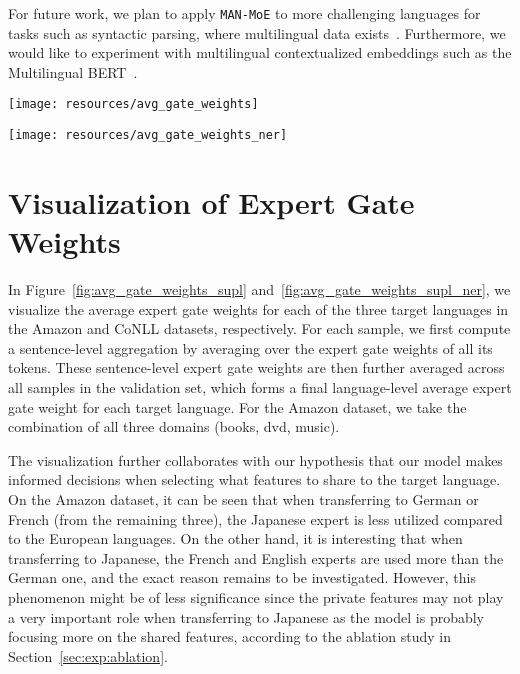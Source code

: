 \documentclass[11pt,a4paper]{article}
\newcommand{\manmoe}{\texttt{MAN-MoE}}
\begin{document}
For future work, we plan to apply \manmoe{} to more challenging languages for tasks such as syntactic parsing, where multilingual data exists~\cite{11234/1-2184}.
Furthermore, we would like to experiment with multilingual contextualized embeddings such as the Multilingual BERT~\cite{devlin2018bert}. 



\clearpage

\appendices
\begin{figure*}
    \centering
\texttt{[image: resources/avg\_gate\_weights]}
    \caption{Average expert gate weights aggregated on a language level for the Amazon dataset.}
    \label{fig:avg_gate_weights_supl}
\end{figure*}

\begin{figure*}
    \centering
\texttt{[image: resources/avg\_gate\_weights\_ner]}
    \caption{Average expert gate weights aggregated on a language level for the CoNLL dataset.}
    \label{fig:avg_gate_weights_supl_ner}
\end{figure*} 
\section{Visualization of Expert Gate Weights}\label{sec:visualization}

In Figure~\ref{fig:avg_gate_weights_supl} and~\ref{fig:avg_gate_weights_supl_ner}, we visualize the average expert gate weights for each of the three target languages in the Amazon and CoNLL datasets, respectively.
For each sample, we first compute a sentence-level aggregation by averaging over the expert gate weights of all its tokens.
These sentence-level expert gate weights are then further averaged across all samples in the validation set, which forms a final language-level average expert gate weight for each target language.
For the Amazon dataset, we take the combination of all three domains (books, dvd, music).

The visualization further collaborates with our hypothesis that our model makes informed decisions when selecting what features to share to the target language.
On the Amazon dataset, it can be seen that when transferring to German or French (from the remaining three), the Japanese expert is less utilized compared to the European languages.
On the other hand, it is interesting that when transferring to Japanese, the French and English experts are used more than the German one, and the exact reason remains to be investigated.
However, this phenomenon might be of less significance since the private features may not play a very important role when transferring to Japanese as the model is probably focusing more on the shared features, according to the ablation study in Section~\ref{sec:exp:ablation}.
\end{document}
